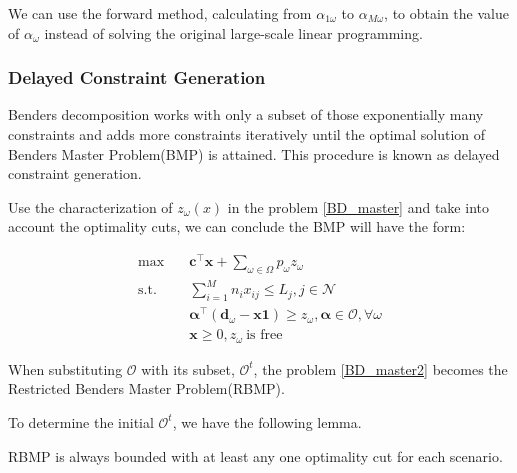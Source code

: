 
We can use the forward method, calculating from $\alpha_{1 \omega}$ to $\alpha_{M \omega}$, to obtain the value of $\alpha_{\omega}$ instead of solving the original large-scale linear programming.

\subsubsection{Delayed Constraint Generation}\label{bender_stage}
Benders decomposition works with only a subset of those exponentially many constraints and adds more constraints iteratively until the optimal solution of Benders Master Problem(BMP) is attained. This procedure is known as delayed constraint generation.

Use the characterization of $z_{\omega}(x)$ in the problem \eqref{BD_master} and take into account the optimality cuts, we can conclude the BMP will have the form:

\begin{equation}\label{BD_master2}
  \begin{aligned}
    \max \quad & \mathbf{c}^{\intercal} \mathbf{x} + \sum_{\omega \in \Omega} p_{\omega} z_{\omega} \\
    \text {s.t.} \quad & \sum_{i=1}^{M} n_{i} x_{ij} \leq L_j, j \in \mathcal{N} \\
    & \bm{\alpha}^{\intercal}(\mathbf{d}_{\omega}- \mathbf{x} \mathbf{1}) \geq z_{\omega}, \bm{\alpha} \in \mathcal{O}, \forall \omega \\
     & \mathbf{x} \geq 0, z_{\omega} ~\text{is free}
  \end{aligned}
\end{equation}

When substituting $\mathcal{O}$ with its subset, $\mathcal{O}^{t}$, the problem \eqref{BD_master2} becomes the Restricted Benders Master Problem(RBMP). 

To determine the initial $\mathcal{O}^{t}$, we have the following lemma.

\begin{lem}\label{one_ep_feasible}
RBMP is always bounded with at least any one optimality cut for each scenario.
\end{lem}

